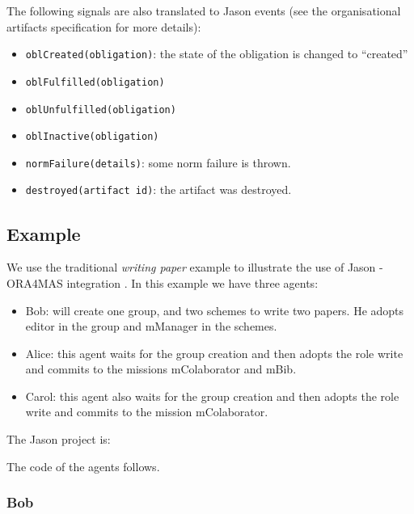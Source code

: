\documentclass{article}
\newcommand{\code}[1]{\texttt{#1}}
\begin{document}
The following signals are also translated to Jason events (see the
organisational artifacts specification for more details):
\begin{itemize}
\item \code{oblCreated(obligation)}: the state of the obligation is changed to ``created'' 
\item \code{oblFulfilled(obligation)}
\item \code{oblUnfulfilled(obligation)}
\item \code{oblInactive(obligation)}
\item \code{normFailure(details)}: some norm failure is thrown. 
\item \code{destroyed(artifact id)}: the artifact was destroyed.
\end{itemize}


\subsection*{Example}

We use the traditional \emph{writing paper} example to illustrate the
use of Jason - ORA4MAS integration \cite{hubner:09c}. In this example
we have three agents:
\begin{itemize}
\item Bob: will create one group, and two schemes to write two
  papers. He adopts editor in the group and mManager in the schemes.
\item Alice: this agent waits for the group creation and then adopts
  the role write and commits to the missions mColaborator and mBib.
\item Carol: this agent also waits for the group creation and then adopts
  the role write and commits to the mission mColaborator.
\end{itemize}

The Jason project is:






The code of the agents follows.
\subsubsection*{Bob}
\end{document}
